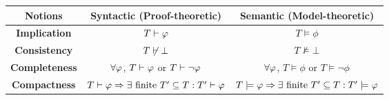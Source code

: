 \documentclass{article}
\begin{document}
    \begin{center}
        \begin{tabular}{|c|c|c|}
            \hline
            Notions & \textbf{Syntactic} (Proof-theoretic) & \textbf{Semantic} (Model-theoretic) \\
            \hline
            \textbf{Implication} & $T\vdash\varphi$ & $T\models\phi$ \\
            \hline
            \textbf{Consistency} & $T\not\vdash\bot$ & $T\not\models\bot$ \\
            \hline
            \textbf{Completeness} & $\forall\varphi$, $T\vdash\varphi$ or $T\vdash\lnot\varphi$ & $\forall\varphi$, $T\models\phi$ or $T\models\lnot\phi$ \\
            \hline
            \textbf{Compactness} & $T\vdash\varphi\Rightarrow\exists\textrm{ finite }T'\subseteq T: T'\vdash\varphi$ & $T\models\varphi\Rightarrow\exists\textrm{ finite }T'\subseteq T: T'\models\varphi$ \\
            \hline
        \end{tabular}
    \end{center}
\end{document}

